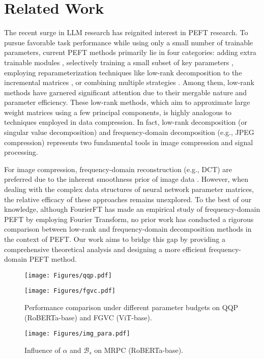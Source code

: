 \section{Related Work}
The recent surge in LLM research has reignited interest in PEFT research. To pursue favorable task performance while using only a small number of trainable parameters, current PEFT methods primarily lie in four categories: adding extra trainable modules \citep{houlsby2019parameter,ruckle2020adapterdrop}, selectively training a small subset of key parameters \citep{zaken2021bitfit,lawton2023neural}, employing reparameterization techniques like low-rank decomposition to the incremental matrices \citep{hu2021lora,zhang2023adalora,liu2024dora,hao2024flora}, or combining multiple strategies \citep{chen2023parameter}. Among them, low-rank methods have garnered significant attention due to their mergable nature and parameter efficiency. These low-rank methods, which aim to approximate large weight matrices using a few principal components, is highly analogous to techniques employed in data compression. In fact, low-rank decomposition (or singular value decomposition) and frequency-domain decomposition (e.g., JPEG compression) represents two fundamental tools in image compression and signal processing.
    
    For image compression, frequency-domain reconstruction (e.g., DCT) are preferred due to the inherent smoothness prior of image data \citep{wallace1991jpeg}. However, when dealing with the complex data structures of neural network parameter matrices, the relative efficacy of these approaches remains unexplored. To the best of our knowledge, although FourierFT \citep{gao2024parameter} has made an empirical study of frequency-domain PEFT by employing Fourier Transform, no prior work has conducted a rigorous comparison between low-rank and frequency-domain decomposition methods in the context of PEFT. Our work aims to bridge this gap by providing a comprehensive theoretical analysis and designing a more efficient frequency-domain PEFT method. 

\begin{figure}[t]
    \centering
    \begin{minipage}{0.63\textwidth}
        \centering
    \begin{minipage}[t]{0.43\linewidth}
    \centering
    \texttt{[image: Figures/qqp.pdf]}
    \end{minipage}%
    \begin{minipage}[t]{0.43\linewidth}
    \centering
    \texttt{[image: Figures/fgvc.pdf]}
    \end{minipage}
    \centering
    \caption{Performance comparison under different parameter budgets on QQP (RoBERTa-base) and FGVC (ViT-base).}
    \label{fig:budget}
    \end{minipage}
    \hfill
    \begin{minipage}{0.32\textwidth}
        \centering
        \texttt{[image: Figures/img\_para.pdf]}
        \caption{Influence of $\alpha$ and $\mathcal{B}_s$ on MRPC (RoBERTa-base).}
        \label{fig:parameter_sen}
    \end{minipage}
    \vspace{-13pt}
\end{figure}